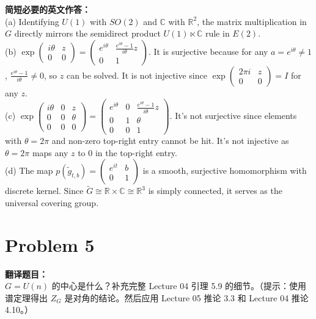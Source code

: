 \documentclass{ctexart}
\begin{document}
\vspace{1em}
\textbf{简短必要的英文作答：}\\
(a) Identifying $U(1)$ with $SO(2)$ and $\mathbb{C}$ with $\mathbb{R}^2$, the matrix multiplication in $G$ directly mirrors the semidirect product $U(1) \ltimes \mathbb{C}$ rule in $E(2)$.\\
(b) $\exp \begin{pmatrix} i\theta & z \\ 0 & 0 \end{pmatrix} = \begin{pmatrix} e^{i\theta} & \frac{e^{i\theta}-1}{i\theta}z \\ 0 & 1 \end{pmatrix}$. It is surjective because for any $a=e^{i\theta} \neq 1$, $\frac{e^{i\theta}-1}{i\theta} \neq 0$, so $z$ can be solved. It is not injective since $\exp \begin{pmatrix} 2\pi i & z \\ 0 & 0 \end{pmatrix} = I$ for any $z$.\\
(c) $\exp \begin{pmatrix} i\theta & 0 & z \\ 0 & 0 & \theta \\ 0 & 0 & 0 \end{pmatrix} = \begin{pmatrix} e^{i\theta} & 0 & \frac{e^{i\theta}-1}{i\theta}z \\ 0 & 1 & \theta \\ 0 & 0 & 1 \end{pmatrix}$. It's not surjective since elements with $\theta = 2\pi$ and non-zero top-right entry cannot be hit. It's not injective as $\theta = 2\pi$ maps any $z$ to $0$ in the top-right entry.\\
(d) The map $p(\tilde{g}_{t,b}) = \begin{pmatrix} e^{it} & b \\ 0 & 1 \end{pmatrix}$ is a smooth, surjective homomorphism with discrete kernel. Since $\tilde{G} \cong \mathbb{R} \times \mathbb{C} \cong \mathbb{R}^3$ is simply connected, it serves as the universal covering group.

\vspace{2em}
\section*{Problem 5}
\textbf{翻译题目：}\\
$G = U(n)$ 的中心是什么？补充完整 Lecture 04 引理 5.9 的细节。（提示：使用谱定理得出 $Z_G$ 是对角的结论。然后应用 Lecture 05 推论 3.3 和 Lecture 04 推论 4.10。）
\end{document}
